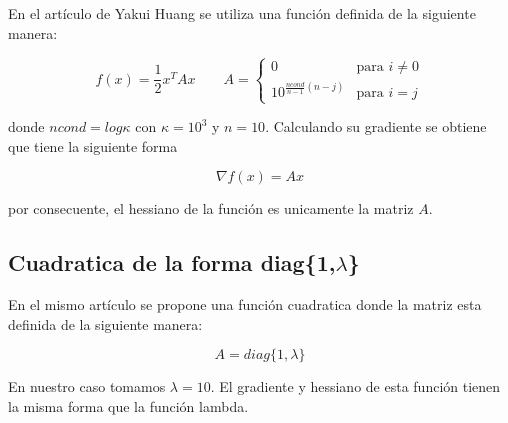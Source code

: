 En el artículo de Yakui Huang\cite{huang_2022_1} se utiliza una función definida de la siguiente manera:

\begin{equation*}
    f(x) = \frac{1}{2}x^TAx \qquad A=\begin{cases}
        0                           & \text{para } i\neq 0 \\
        10^{\frac{ncond}{n-1}(n-j)} & \text{para } i=j
    \end{cases}
\end{equation*}

donde $ncond=log \kappa$ con $\kappa = 10^3$ y $n=10$. Calculando su gradiente se obtiene que tiene la siguiente forma

\begin{equation*}
    \nabla f(x) = Ax
\end{equation*}

por consecuente, el hessiano de la función es unicamente la matriz $A$.

\subsection*{Cuadratica de la forma diag\{1,$\lambda$\}}

En el mismo artículo\cite{huang_2022_1} se propone una función cuadratica donde la matriz esta definida de la siguiente manera:

\begin{equation*}
    A = diag\{1,\lambda\}
\end{equation*}

En nuestro caso tomamos $\lambda=10$. El gradiente y hessiano de esta función tienen la misma forma que la función lambda.